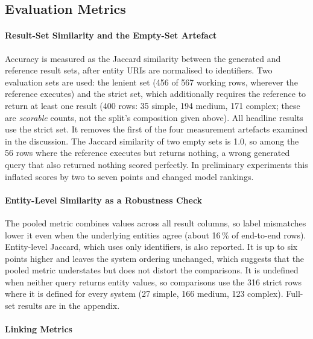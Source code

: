 \subsection{Evaluation Metrics}

\label{sec:setup-metrics}

\paragraph{Result-Set Similarity and the Empty-Set
Artefact}

Accuracy is measured as the Jaccard similarity between the generated and reference result sets, after entity URIs are normalised to identifiers.
Two evaluation sets are used: the lenient set (456 of 567 working rows, wherever the reference executes) and the strict set, which additionally requires the reference to return at least one result (400 rows: 35 simple, 194 medium, 171 complex; these are \emph{scorable} counts, not the split's composition given above).
All headline results use the strict set.
It removes the first of the four measurement artefacts examined in the discussion.
The Jaccard similarity of two empty sets is 1.0, so among the 56 rows where the reference executes but returns nothing, a wrong generated query that also returned nothing scored perfectly.
In preliminary experiments this inflated scores by two to seven points and changed model rankings.

\paragraph{Entity-Level Similarity as a Robustness
Check}

The pooled metric combines values across all result columns, so label mismatches lower it even when the underlying entities agree (about 16\,\% of end-to-end rows).
Entity-level Jaccard, which uses only identifiers, is also reported.
It is up to six points higher and leaves the system ordering unchanged, which suggests that the pooled metric understates but does not distort the comparisons.
It is undefined when neither query returns entity values, so comparisons use the 316 strict rows where it is defined for every system (27 simple, 166 medium, 123 complex).
Full-set results are in the appendix.

\paragraph{Linking Metrics}

